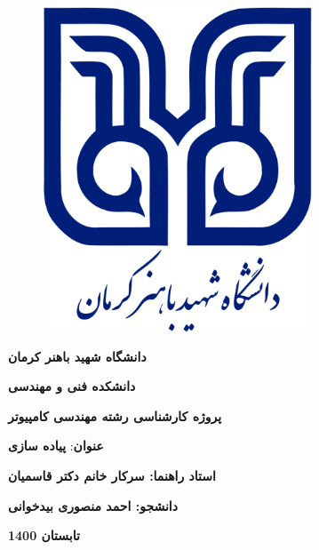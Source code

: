 \documentclass[a4paper, 12pt]{report}
\begin{document}
\begin{titlepage}
\begin{figure}[H]
    \centering
        \includegraphics[width=8cm]{images/logo.png}
\end{figure}

    \begin{center}
      \large
      {\fontsize{13}{1cm} \selectfont \myfont \textbf{دانشگاه شهید باهنر کرمان}\par}
      {\fontsize{12}{1cm} \selectfont \myfont \textbf{دانشکده فنی و مهندسی}\par}
      {\fontsize{18}{1cm} \selectfont \myfont \textbf{پروژه کارشناسی رشته مهندسی کامپیوتر}\par}
      {\fontsize{18}{1cm} \selectfont \titrfont \textbf{عنوان}:
      \titrfont \textbf{پیاده سازی }\par}
      {\fontsize{15}{1cm} \selectfont \myfont \textbf{استاد راهنما: سرکار خانم دکتر قاسمیان}\par}
      {\fontsize{15}{1cm} \selectfont \myfont \textbf{دانشجو: احمد منصوری بیدخوانی}\par}
      \normalsize
      {\fontsize{13}{1cm} \selectfont \myfont \textbf{تابستان 1400}}
    \end{center}

\end{titlepage}
\end{document}
